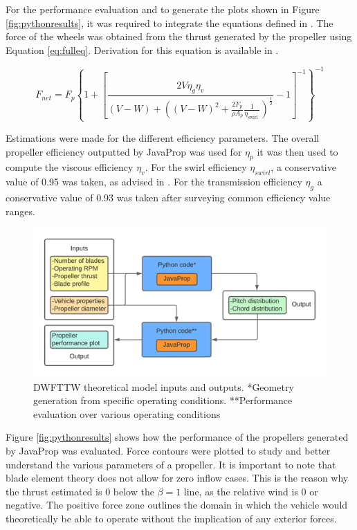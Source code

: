 For the performance evaluation and to generate the plots shown in Figure \ref{fig:pythonresults}, it was required to integrate the equations defined in \cite{drela20dead}. The force of the wheels was obtained from the thrust generated by the propeller using Equation \ref{eq:fulleq}. Derivation for this equation is available in \cite{drela20dead}.

\begin{equation}
F_{n e t}=F_{p}\left\{1+\left[\frac{2 V \eta_{g} \eta_{v}}{(V-W)+\left((V-W)^{2}+\frac{2 F_{p}}{\rho A_{p}} \frac{1}{\eta_{\text{swirl }}}\right)^{\frac{1}{2}}}-1\right]^{-1}\right\}^{-1}
\label{eq:fulleq}
\end{equation}

Estimations were made for the different efficiency parameters. The overall propeller efficiency outputted by JavaProp was used for $\eta_p$ it was then used to compute the viscous efficiency $\eta_v$. For the swirl efficiency $\eta_{swirl}$, a conservative value of 0.95 was taken, as advised in \cite{drela20dead}. For the transmission efficiency $\eta_g$ a conservative value of 0.93 was taken after surveying common efficiency value ranges.

\begin{figure}[!htbp]
    \centering
    \includegraphics{images/part6/flowchart.png}
    \caption{DWFTTW theoretical model inputs and outputs. *Geometry generation from specific operating conditions. **Performance evaluation over various operating conditions}
    \label{fig:pyflowchart}
\end{figure}

Figure \ref{fig:pythonresults} shows how the performance of the propellers generated by JavaProp was evaluated. Force contours were plotted to study and better understand the various parameters of a propeller. It is important to note that blade element theory does not allow for zero inflow cases. This is the reason why the thrust estimated is 0 below the $\beta = 1$ line, as the relative wind is 0 or negative. The positive force zone outlines the domain in which the vehicle would theoretically be able to operate without the implication of any exterior forces.

